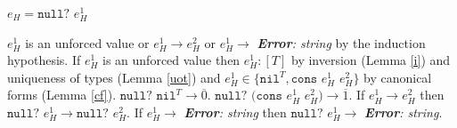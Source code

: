 \begin{case}

$e_{H}=\mathtt{null?}$ $e_{H}^{1}$

$e_{H}^{1}$ is an unforced value or $e_{H}^{1}\rightarrow e_{H}^{2}$ or $e_{H}^{1}\rightarrow$ \emph{\textbf{Error}: string} by the induction hypothesis.  If $e_{H}^{1}$ is an unforced value then $e_{H}^{1}:[T]$ by inversion (Lemma \ref{i}) and uniqueness of types (Lemma \ref{uot}) and $e_{H}^{1}\in\lbrace\mathtt{nil}^{T},\mathtt{cons}$ $e_{H}^{1}$ $e_{H}^{2}\rbrace$ by canonical forms (Lemma \ref{cf}).  $\mathtt{null?}$ $\mathtt{nil}^{T}\rightarrow\overline{0}$.  $\mathtt{null?}$ $(\mathtt{cons}$ $e_{H}^{1}$ $e_{H}^{2})\rightarrow\overline{1}$.  If $e_{H}^{1}\rightarrow e_{H}^{2}$ then $\mathtt{null?}$ $e_{H}^{1}\rightarrow\mathtt{null?}$ $e_{H}^{2}$.  If $e_{H}^{1}\rightarrow$ \emph{\textbf{Error}: string} then $\mathtt{null?}$ $e_{H}^{1}\rightarrow$ \emph{\textbf{Error}: string}.

\end{case}